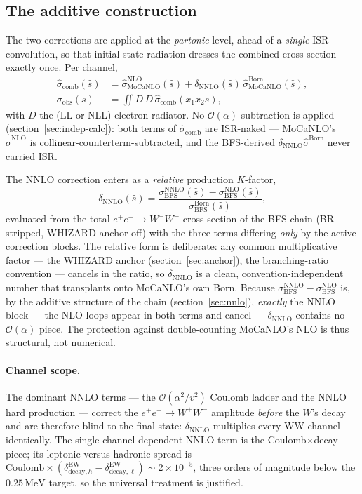 \documentclass[11pt,a4paper]{article}
\newcommand{\MeV}{\ensuremath{\,\mathrm{MeV}}}
\begin{document}
\subsection{The additive construction}\label{sec:match-construction}

The two corrections are applied at the \emph{partonic} level, ahead of a
\emph{single} ISR convolution, so that initial-state radiation dresses the combined
cross section exactly once. Per channel,
\begin{align}
  \hat\sigma_\text{comb}(\hat s) &= \hat\sigma^\text{NLO}_\text{MoCaNLO}(\hat s)
     + \delta_\text{NNLO}(\hat s)\,\hat\sigma^\text{Born}_\text{MoCaNLO}(\hat s),
     \label{eq:match-comb}\\
  \sigma_\text{obs}(s) &= \iint\! D\,D\,\hat\sigma_\text{comb}(x_1 x_2 s),
     \label{eq:match-obs}
\end{align}
with $D$ the (LL or NLL) electron radiator. No $\mathcal O(\alpha)$ subtraction
is applied (section~\ref{sec:indep-calc}): both terms of
$\hat\sigma_\text{comb}$ are ISR-naked --- MoCaNLO's $\hat\sigma^\text{NLO}$ is
collinear-counterterm-subtracted, and the BFS-derived
$\delta_\text{NNLO}\hat\sigma^\text{Born}$ never carried ISR.

The NNLO correction enters as a \emph{relative} production $K$-factor,
\begin{equation}
  \delta_\text{NNLO}(\hat s) = \frac{\sigma^\text{NNLO}_\text{BFS}(\hat s)
     - \sigma^\text{NLO}_\text{BFS}(\hat s)}{\sigma^\text{Born}_\text{BFS}(\hat s)},
  \label{eq:match-dnnlo}
\end{equation}
evaluated from the total $e^+e^-\!\to W^+W^-$ cross section of the BFS chain (BR
stripped, WHIZARD anchor off) with the three terms differing \emph{only} by the
active correction blocks. The relative form is deliberate: any common multiplicative
factor --- the WHIZARD anchor (section~\ref{sec:anchor}), the branching-ratio
convention --- cancels in the ratio, so $\delta_\text{NNLO}$ is a clean,
convention-independent number that transplants onto MoCaNLO's own Born. Because
$\sigma^\text{NNLO}_\text{BFS}-\sigma^\text{NLO}_\text{BFS}$ is, by the additive
structure of the chain (section~\ref{sec:nnlo}), \emph{exactly} the NNLO block --- the
NLO loops appear in both terms and cancel --- $\delta_\text{NNLO}$ contains no
$\mathcal O(\alpha)$ piece. The protection against double-counting MoCaNLO's NLO is
thus structural, not numerical.

\paragraph{Channel scope.} The dominant NNLO terms --- the
$\mathcal O(\alpha^2/v^2)$ Coulomb ladder and the NNLO hard production --- correct the
$e^+e^-\!\to W^+W^-$ amplitude \emph{before} the $W$'s decay and are therefore blind
to the final state: $\delta_\text{NNLO}$ multiplies every WW channel identically. The
single channel-dependent NNLO term is the Coulomb$\times$decay piece; its
leptonic-versus-hadronic spread is
$\text{Coulomb}\times(\delta^\text{EW}_{\text{decay},h}-\delta^\text{EW}_{\text{decay},\ell})
\sim 2\times10^{-5}$, three orders of magnitude below the $0.25\MeV$ target, so the
universal treatment is justified.
\end{document}
